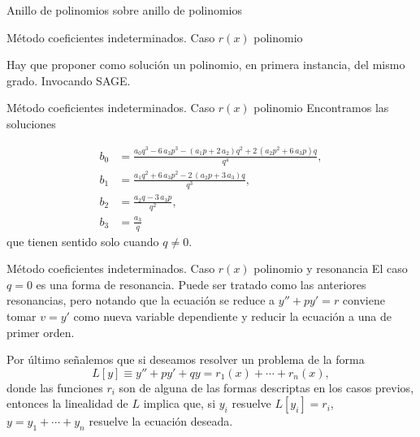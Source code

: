 \documentclass[handout,hyperref={colorlinks=true}]{beamer}
\begin{document}
   \begin{frame}{Anillo de polinomios sobre anillo de polinomios}

\lstI


\end{frame}




\begin{frame}{Método coeficientes indeterminados. Caso $r(x)$ polinomio}
 
Hay que proponer como solución un polinomio, en primera instancia, del mismo grado. Invocando SAGE.

\lstI

\end{frame}

\begin{frame}{Método coeficientes indeterminados. Caso $r(x)$ polinomio}
Encontramos las soluciones

\[
  \begin{split}
      b_{0} &= \frac{a_{0} q^{3} - 6 \, a_{3} p^{3} - {\left(a_{1} p + 2 \, a_{2}\right)} q^{2} + 2 \, {\left(a_{2} p^{2} + 6 \, a_{3} p\right)} q}{q^{4}},\\
      b_{1} &= \frac{a_{1} q^{2} + 6 \, a_{3} p^{2} - 2 \, {\left(a_{2} p + 3 \, a_{3}\right)} q}{q^{3}},\\
      b_{2} &= \frac{a_{2} q - 3 \, a_{3} p}{q^{2}},\\
      b_{3} &= \frac{a_{3}}{q}
  \end{split}
\]
que tienen sentido solo cuando $q\neq 0$.
\end{frame}

\begin{frame}{Método coeficientes indeterminados. Caso $r(x)$ polinomio y resonancia}
El caso $q=0$ es una forma de resonancia. Puede ser tratado como las anteriores resonancias, pero notando que la ecuación se reduce a $y''+py'=r$ conviene 
tomar $v=y'$ como
nueva variable dependiente y reducir la ecuación a una de primer orden.

Por último señalemos que si deseamos resolver un problema de la forma
\[L[y]\equiv y''+py'+qy=r_1(x)+\cdots +r_n(x),\]
donde las funciones $r_i$ son de alguna de las formas descriptas en los casos previos,
entonces la linealidad de $L$ implica que, si $y_i$ 
resuelve $L[y_i]=r_i$, $y=y_1+\cdots +y_n$ resuelve la ecuación deseada. 

\end{frame}
\end{document}
